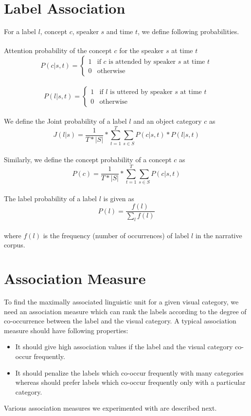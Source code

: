 \documentclass[12pt, a4paper]{report}
\begin{document}
\section{Label Association}
For a label $l$, concept $c$, speaker $s$ and time $t$, we define following probabilities.\\
\\
Attention probability of the concept $c$ for the speaker $s$ at time $t$\\
$$
P(c|s,t) = \begin{cases} 1 & \mbox{if $c$ is attended by speaker $s$ at time $t$} \\ 0 & \mbox{otherwise}\end{cases}
$$
\\
$$
P(l|s,t) = \begin{cases} 1 & \mbox{if $l$ is uttered by speaker $s$ at time $t$} \\ 0 & \mbox{otherwise}\end{cases}
$$
\\
We define the Joint probability of a label $l$ and an object category $c$ as\\
$$
J(l|s) = \frac{1}{T \ast |S|} \ast \sum_{t=1}^{T}\sum_{s \in S}P(c|s,t) \ast P(l|s,t) 
$$
\\
Similarly, we define the concept probability of a concept $c$ as\\
$$
P(c) = \frac{1}{T \ast |S|} \ast \sum_{t=1}^{T}\sum_{s \in S}P(c|s,t)
$$
\\
The label probability of a label $l$ is given as\\
$$
P(l) = \frac{f(l)}{\sum_{l}{f(l)}}
$$
\\
where $f(l)$ is the frequency (number of occurrences) of label $l$ in the narrative corpus.


\section{Association Measure}
To find the maximally associated linguistic unit for a given visual category, we need an association measure which can rank the labels according to the degree of co-occurrence between the label and the visual category. A typical association measure should have following properties:\\
\begin{itemize}
\item It should give high association values if the label and the visual category co-occur frequently.
\item It should penalize the labels which co-occur frequently with many categories whereas should prefer labels which co-occur frequently only with a particular category.
\end{itemize}
Various association measures we experimented with are described next.
\end{document}
